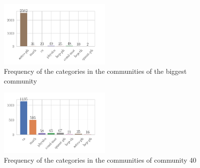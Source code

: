 \begin{multicols}{2}
	\begin{figure}[H]
		\includegraphics[width=0.49\textwidth]{figures/community_dist_biggest}
		\caption{Frequency of the categories in the communities of the biggest community}%
		\label{fig:community_freq}
	\end{figure}

	\begin{figure}[H]
		\includegraphics[width=0.49\textwidth]{figures/community_dist_cs}
		\caption{Frequency of the categories in the communities of community 40}%
		\label{fig:community_freq_cs}
	\end{figure}
\end{multicols}
